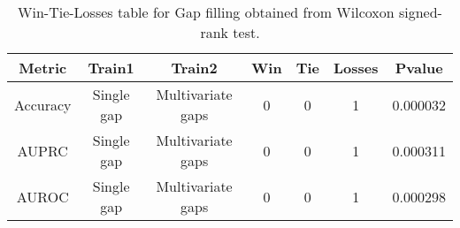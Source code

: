 \begin{table}[H]
\centering
\begin{tabular}{|c|c|c|c|c|c|c|}

\textbf{Metric} & \textbf{Train1} &    \textbf{Train2} &  \textbf{Win} &  \textbf{Tie} &  \textbf{Losses} &  \textbf{Pvalue} \\
\hline

       Accuracy &      Single gap &  Multivariate gaps &             0 &             0 &                1 &         0.000032 \\
\hline
          AUPRC &      Single gap &  Multivariate gaps &             0 &             0 &                1 &         0.000311 \\
\hline
          AUROC &      Single gap &  Multivariate gaps &             0 &             0 &                1 &         0.000298 \\
\hline

\end{tabular}
\caption{Win-Tie-Losses table for Gap filling obtained from Wilcoxon signed-rank test.}
\label{tab:gap_filling_training_data_comparison}
\end{table}